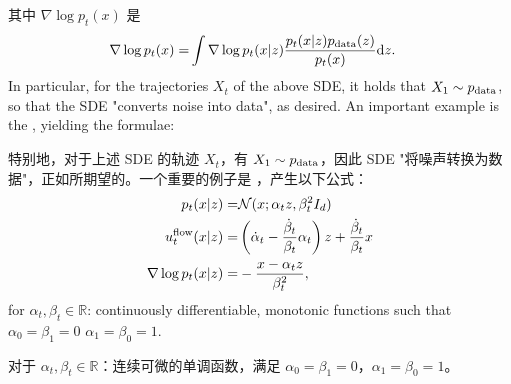 \begin{summarybox}
其中 $\nabla\log p_t(x)$ 是 
\begin{align}
\nabla\log p_t(x) =&\int \nabla \log p_t(x|z)\frac{ p_t(x|z)p_{\rm{data}}(z)}{p_t(x)}\mathrm{d} z.
\end{align}
In particular, for the trajectories $X_t$ of the above SDE, it holds that $X_1\sim p_{\rm{data}}$, so that the SDE "converts noise into data", as desired. An important example is the , yielding the formulae:

特别地，对于上述 SDE 的轨迹 $X_t$，有 $X_1\sim p_{\rm{data}}$，因此 SDE "将噪声转换为数据"，正如所期望的。一个重要的例子是 ，产生以下公式：
\begin{align}
p_t(x|z) =& \mathcal{N}(x;\alpha_t z,\beta_t^2 I_d)\\
u^{\text{flow}}_t(x|z)=&\left(\dot{\alpha}_t-\frac{\dot{\beta}_t}{\beta_t}\alpha_t\right)z+\frac{\dot{\beta}_t}{\beta_t}x\\
\nabla \log p_t(x|z) =& -\frac{x-\alpha_t z}{\beta_t^2},
\end{align}
for  $\alpha_t,\beta_t\in\mathbb{R}$: continuously differentiable, monotonic functions such that $\alpha_0=\beta_1=0$ $\alpha_1=\beta_0=1$.

对于  $\alpha_t,\beta_t\in\mathbb{R}$：连续可微的单调函数，满足 $\alpha_0=\beta_1=0$，$\alpha_1=\beta_0=1$。
\end{summarybox}

